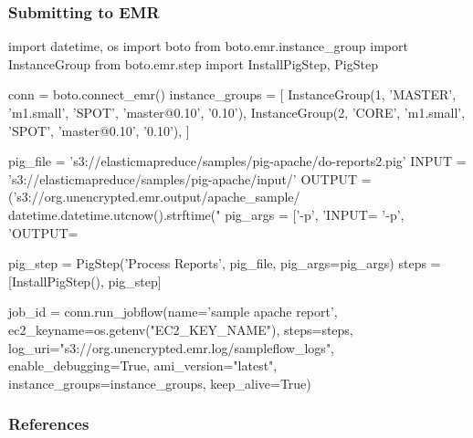 \documentclass{beamer}
\begin{document}
\begin{frame}[fragile]
  \frametitle{Submitting to EMR}
  \begin{python}
    import datetime, os
    import boto
    from boto.emr.instance_group import InstanceGroup
    from boto.emr.step import InstallPigStep, PigStep

    conn = boto.connect_emr()
    instance_groups = [
        InstanceGroup(1, 'MASTER', 'm1.small', 'SPOT', 'master@0.10', '0.10'),
        InstanceGroup(2, 'CORE', 'm1.small', 'SPOT', 'master@0.10', '0.10'),
        ]

    pig_file = 's3://elasticmapreduce/samples/pig-apache/do-reports2.pig'
    INPUT = 's3://elasticmapreduce/samples/pig-apache/input/'
    OUTPUT = ('s3://org.unencrypted.emr.output/apache_sample/%
              datetime.datetime.utcnow().strftime("%
    pig_args = ['-p', 'INPUT=%
                '-p', 'OUTPUT=%

    pig_step = PigStep('Process Reports', pig_file, pig_args=pig_args)
    steps = [InstallPigStep(), pig_step]

    job_id = conn.run_jobflow(name='sample apache report',
        ec2_keyname=os.getenv("EC2_KEY_NAME"), steps=steps,
        log_uri="s3://org.unencrypted.emr.log/sampleflow_logs", enable_debugging=True,
        ami_version="latest", instance_groups=instance_groups, keep_alive=True)
  \end{python}
\end{frame}

\frame
{
  \frametitle{References}
  \printbibliography
}
\end{document}
